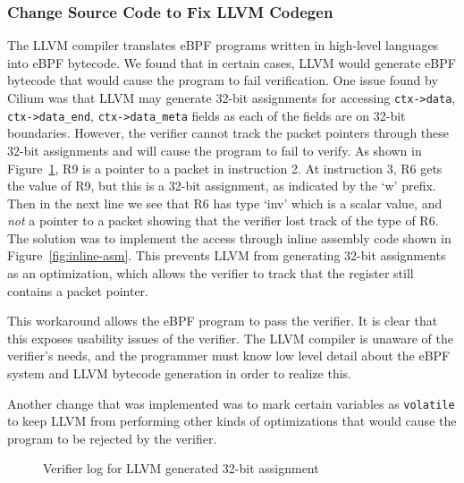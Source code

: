 \subsubsection{Change Source Code to Fix LLVM Codegen}
The LLVM compiler translates eBPF programs written in high-level languages into eBPF bytecode.
We found that in certain cases, LLVM would generate eBPF bytecode that would cause the program to fail verification.
One issue found by Cilium was that LLVM may generate 32-bit assignments for
    accessing \texttt{ctx->data}, \texttt{ctx->data\_end}, \texttt{ctx->data\_meta} fields as
    each of the fields are on 32-bit boundaries.
However, the verifier cannot track the packet pointers through these 32-bit assignments and
    will cause the program to fail to verify.
As shown in Figure~\ref{fig:inline-error}, R9 is a pointer to a packet in instruction 2.
At instruction 3, R6 gets the value of R9, but this is a 32-bit assignment, as indicated by the `w' prefix.
Then in the next line we see that R6 has type `inv' which is a scalar value, and \emph{not} a pointer to a packet showing that the verifier lost track of the type of R6.
The solution was to implement the access through inline assembly code shown in Figure~\ref{fig:inline-asm}.
This prevents LLVM from generating 32-bit assignments as an optimization, which allows the verifier to track that the register still contains a packet pointer.


This workaround allows the eBPF program to pass the verifier.
It is clear that this exposes usability issues of the verifier.
The LLVM compiler is unaware of the verifier's needs, and the programmer must know low level detail about the eBPF system and LLVM bytecode generation in order to realize this.

Another change that was implemented was to mark certain variables as \texttt{volatile}
to keep LLVM from performing other kinds of optimizations that would cause the program to be rejected by the verifier.

\begin{figure}
    
    \caption{Verifier log for LLVM generated 32-bit assignment}
    \label{fig:inline-error}
\end{figure}

